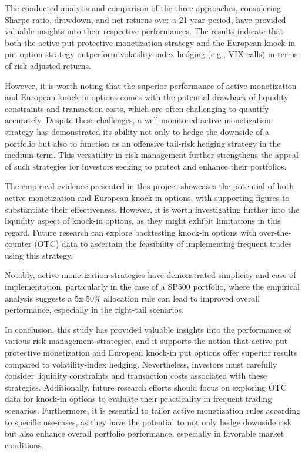 \documentclass[12pt]{article}
\begin{document}
{{The conducted analysis and comparison of the three approaches, considering Sharpe ratio, drawdown, and net returns over a 21-year period, have provided valuable insights into their respective performances. The results indicate that both the active put protective monetization strategy and the European knock-in put option strategy outperform volatility-index hedging (e.g., VIX calls) in terms of risk-adjusted returns.

However, it is worth noting that the superior performance of active monetization and European knock-in options comes with the potential drawback of liquidity constraints and transaction costs, which are often challenging to quantify accurately. Despite these challenges, a well-monitored active monetization strategy has demonstrated its ability not only to hedge the downside of a portfolio but also to function as an offensive tail-risk hedging strategy in the medium-term. This versatility in risk management further strengthens the appeal of such strategies for investors seeking to protect and enhance their portfolios.

The empirical evidence presented in this project showcases the potential of both active monetization and European knock-in options, with supporting figures to substantiate their effectiveness. However, it is worth investigating further into the liquidity aspect of knock-in options, as they might exhibit limitations in this regard. Future research can explore backtesting knock-in options with over-the-counter (OTC) data to ascertain the feasibility of implementing frequent trades using this strategy.

Notably, active monetization strategies have demonstrated simplicity and ease of implementation, particularly in the case of a SP500 portfolio, where the empirical analysis suggests a 5x 50\% allocation rule can lead to improved overall performance, especially in the right-tail scenarios.

In conclusion, this study has provided valuable insights into the performance of various risk management strategies, and it supports the notion that active put protective monetization and European knock-in put options offer superior results compared to volatility-index hedging. Nevertheless, investors must carefully consider liquidity constraints and transaction costs associated with these strategies. Additionally, future research efforts should focus on exploring OTC data for knock-in options to evaluate their practicality in frequent trading scenarios. Furthermore, it is essential to tailor active monetization rules according to specific use-cases, as they have the potential to not only hedge downside risk but also enhance overall portfolio performance, especially in favorable market conditions.

}}
\end{document}
